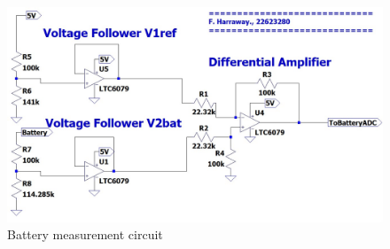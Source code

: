 \begin{figure}[!htb]
	\centering
	\includegraphics[width=0.5\linewidth]{Figures/A6/Batterysig.jpg}
	\caption{Battery measurement circuit}
	\label{fig:batcirc}
\end{figure}







